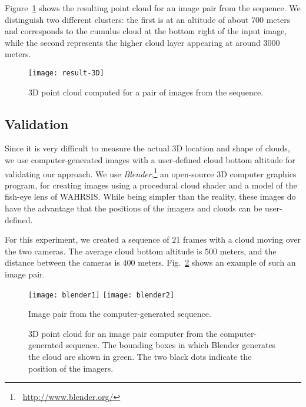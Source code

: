 Figure~\ref{fig:result-real-image} shows the resulting point cloud for an image pair from the  sequence. We distinguish two different clusters: the first is at an altitude of about $700$ meters and corresponds to the cumulus cloud at the bottom right of the input image, while the second represents the higher cloud layer appearing at around $3000$ meters.

\begin{figure}[htb]
\centering
\texttt{[image: result-3D]}
\caption{3D point cloud computed for a pair of images from the sequence.}
\label{fig:result-real-image}
\end{figure}




\subsection{Validation}
Since it is very difficult to measure the actual 3D location and shape of clouds, we use computer-generated images with a user-defined cloud bottom altitude for validating our approach. We use \emph{Blender},\footnote{~\url{http://www.blender.org/}} an open-source 3D computer graphics program, for creating images using a procedural cloud shader and a model of the fish-eye lens of WAHRSIS. While being simpler than the reality, these images do have the advantage that the positions of the imagers and clouds can be user-defined. 

For this experiment, we created a sequence of $21$ frames with a cloud moving over the two cameras. The average cloud bottom altitude is $500$ meters, and the distance between the cameras is $400$ meters. Fig.~\ref{fig:blender-generated} shows an example of such an image pair.

\begin{figure}[htb]
\centering
\texttt{[image: blender1]}
\texttt{[image: blender2]}
\caption{Image pair from the computer-generated sequence.}
\label{fig:blender-generated}
\end{figure}

\begin{figure}[htb]
\centering
{}
\caption[Illustration of 3D point cloud for an image pair computer from the computer-generated sequence.]{3D point cloud for an image pair computer from the computer-generated sequence.  The bounding boxes in which Blender generates the cloud are shown in green. The two black dots indicate the position of the imagers.}\label{fig:results-blender}
\end{figure}

